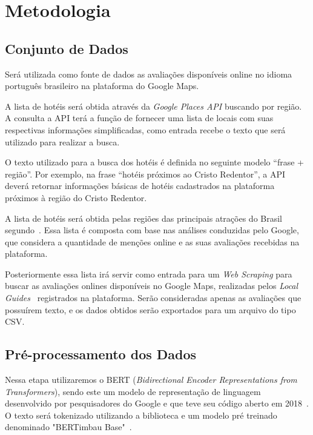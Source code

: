 \chapter{Metodologia}
\label{cap:metodologia}

\section{Conjunto de Dados}

Será utilizada como fonte de dados as avaliações disponíveis online no idioma português brasileiro na plataforma do Google Maps.

A lista de hotéis será obtida através da \emph{Google Places API} buscando por região. A consulta a API terá a função de fornecer uma lista de locais com suas respectivas informações simplificadas, como entrada recebe o texto que será utilizado para realizar a busca.

O texto utilizado para a busca dos hotéis é definida no seguinte modelo “frase + região”. Por exemplo, na frase “hotéis próximos ao Cristo Redentor”, a API deverá retornar informações básicas de hotéis cadastrados na plataforma próximos à região do Cristo Redentor.

A lista de hotéis será obtida pelas regiões das principais atrações do Brasil segundo~\cite{googleFlights2022destinos}. Essa lista é composta com base nas análises conduzidas pelo Google, que considera a quantidade de menções online e as suas avaliações recebidas na plataforma.

Posteriormente essa lista irá servir como entrada para um \emph{Web Scraping} para buscar as avaliações onlines disponíveis no Google Maps, realizadas pelos \emph{Local Guides}~\cite{google2022localguides} registrados na plataforma. Serão consideradas apenas as avaliações que possuírem texto, e os dados obtidos serão exportados para um arquivo do tipo CSV.

\section{Pré-processamento dos Dados}

Nessa etapa utilizaremos o BERT (\emph{Bidirectional Encoder Representations from Transformers}), sendo este um modelo de representação de linguagem desenvolvido por pesquisadores do Google e que teve seu código aberto em 2018~\cite{hugoZanini2021mediu}. O texto será tokenizado utilizando a biblioteca e um modelo pré treinado denominado "BERTimbau Base"~\cite{souza2020bertimbau}.

